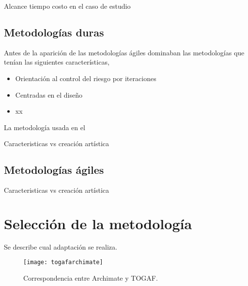 Alcance tiempo costo en el caso de estudio

\subsection{Metodologías duras}

Antes de la aparición de las metodologías ágiles dominaban las metodologías que tenían las siguientes características,

\begin{itemize}
  \item Orientación al control del riesgo por iteraciones
  \item Centradas en el diseño
  \item xx
\end{itemize}

La metodología usada en el

Caracteristicas vs creación artística

\subsection{Metodologías ágiles}

Caracteristicas vs creación artística

\section{Selección de la metodología}

Se describe cual adaptación se realiza.










\begin{figure}[h]\label{togafarchimate}
\centering
\texttt{[image: togafarchimate]}
\caption{Correspondencia entre Archimate y TOGAF.}
\end{figure}
